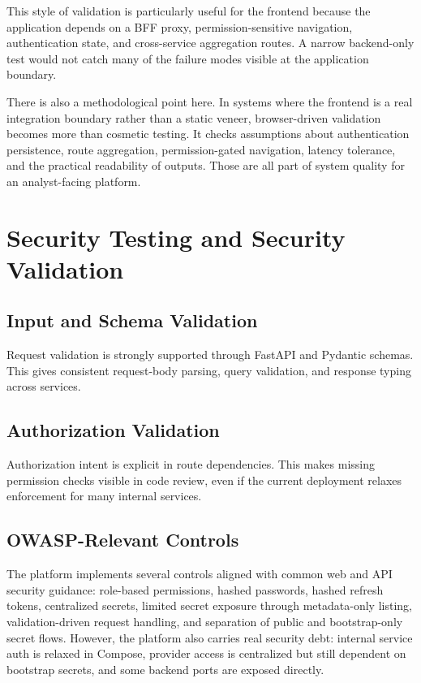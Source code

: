 This style of validation is particularly useful for the frontend because the application depends on a BFF proxy, permission-sensitive navigation, authentication state, and cross-service aggregation routes. A narrow backend-only test would not catch many of the failure modes visible at the application boundary.

There is also a methodological point here. In systems where the frontend is a real integration boundary rather than a static veneer, browser-driven validation becomes more than cosmetic testing. It checks assumptions about authentication persistence, route aggregation, permission-gated navigation, latency tolerance, and the practical readability of outputs. Those are all part of system quality for an analyst-facing platform.

\section{Security Testing and Security Validation}
\subsection{Input and Schema Validation}
Request validation is strongly supported through FastAPI and Pydantic schemas. This gives consistent request-body parsing, query validation, and response typing across services.

\subsection{Authorization Validation}
Authorization intent is explicit in route dependencies. This makes missing permission checks visible in code review, even if the current deployment relaxes enforcement for many internal services.

\subsection{OWASP-Relevant Controls}
The platform implements several controls aligned with common web and API security guidance: role-based permissions, hashed passwords, hashed refresh tokens, centralized secrets, limited secret exposure through metadata-only listing, validation-driven request handling, and separation of public and bootstrap-only secret flows. However, the platform also carries real security debt: internal service auth is relaxed in Compose, provider access is centralized but still dependent on bootstrap secrets, and some backend ports are exposed directly.

